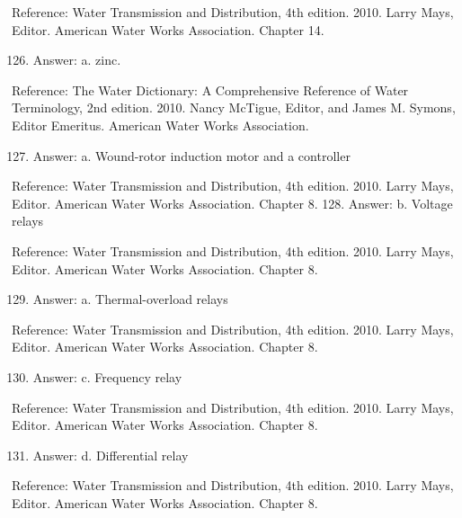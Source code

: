 \documentclass[10pt]{article}
\begin{document}
Reference: Water Transmission and Distribution, 4th edition. 2010. Larry Mays, Editor. American Water Works Association. Chapter 14.

\begin{enumerate}
  \setcounter{enumi}{125}
  \item Answer: a. zinc.
\end{enumerate}

Reference: The Water Dictionary: A Comprehensive Reference of Water Terminology, 2nd edition. 2010. Nancy McTigue, Editor, and James M. Symons, Editor Emeritus. American Water Works Association.

\begin{enumerate}
  \setcounter{enumi}{126}
  \item Answer: a. Wound-rotor induction motor and a controller
\end{enumerate}

Reference: Water Transmission and Distribution, 4th edition. 2010. Larry Mays, Editor. American Water Works Association. Chapter 8. 128. Answer: b. Voltage relays

Reference: Water Transmission and Distribution, 4th edition. 2010. Larry Mays, Editor. American Water Works Association. Chapter 8.

\begin{enumerate}
  \setcounter{enumi}{128}
  \item Answer: a. Thermal-overload relays
\end{enumerate}

Reference: Water Transmission and Distribution, 4th edition. 2010. Larry Mays, Editor. American Water Works Association. Chapter 8.

\begin{enumerate}
  \setcounter{enumi}{129}
  \item Answer: c. Frequency relay
\end{enumerate}

Reference: Water Transmission and Distribution, 4th edition. 2010. Larry Mays, Editor. American Water Works Association. Chapter 8.

\begin{enumerate}
  \setcounter{enumi}{130}
  \item Answer: d. Differential relay
\end{enumerate}

Reference: Water Transmission and Distribution, 4th edition. 2010. Larry Mays, Editor. American Water Works Association. Chapter 8.
\end{document}
